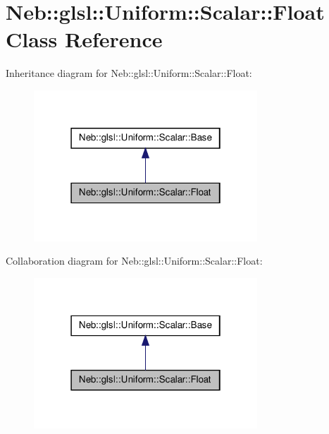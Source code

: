 \hypertarget{classNeb_1_1glsl_1_1Uniform_1_1Scalar_1_1Float}{\section{\-Neb\-:\-:glsl\-:\-:\-Uniform\-:\-:\-Scalar\-:\-:\-Float \-Class \-Reference}
\label{classNeb_1_1glsl_1_1Uniform_1_1Scalar_1_1Float}
}


\-Inheritance diagram for \-Neb\-:\-:glsl\-:\-:\-Uniform\-:\-:\-Scalar\-:\-:\-Float\-:\nopagebreak
\begin{figure}[H]
\begin{center}
\leavevmode
\includegraphics[width=238pt]{classNeb_1_1glsl_1_1Uniform_1_1Scalar_1_1Float__inherit__graph}
\end{center}
\end{figure}


\-Collaboration diagram for \-Neb\-:\-:glsl\-:\-:\-Uniform\-:\-:\-Scalar\-:\-:\-Float\-:\nopagebreak
\begin{figure}[H]
\begin{center}
\leavevmode
\includegraphics[width=238pt]{classNeb_1_1glsl_1_1Uniform_1_1Scalar_1_1Float__coll__graph}
\end{center}
\end{figure}
